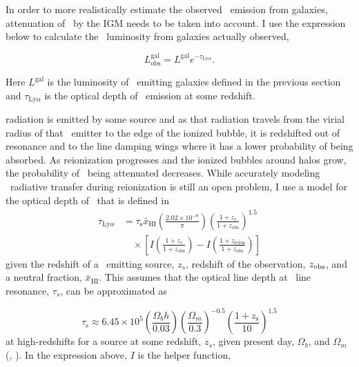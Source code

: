 In order to more realistically estimate the observed \lya\ emission from galaxies,
attenuation of \lya\ by the IGM needs to be taken into account. I use the expression
below to calculate the \lya\ luminosity from galaxies actually observed,

\begin{equation}
L^{\textrm{gal}}_{\textrm{obs}} = L^{\textrm{gal}} e^{-\tau_{\textrm{Ly}\alpha}}.
\end{equation}

Here $L^{\textrm{gal}}$ is the luminosity of \lya\ emitting galaxies defined in the previous section and
$\tau_{\textrm{Ly}\alpha}$ is the optical depth of \lya\ emission at some redshift.

\lya radiation is emitted by some source and as that radiation travels from the virial
radius of that \lya\ emitter to the edge of the ionized bubble, it is redshifted
out of resonance and to the line damping wings where it has a lower probability of
being absorbed. As reionization progresses and the ionized bubbles around halos grow,
the probability of \lya\ being attenuated decreases. While accurately modeling
\lya\ radiative transfer during reionization is still an open problem, I use a
model for the optical depth of \lya\ that is defined in \cite{1998ApJ...501...15M}
\begin{align}
\tau_{\textrm{Ly}\alpha} &= \tau_{\textrm{s}} \bar{x}_{\textrm{HI}} \left( \frac{2.02 \times 10^{-8}}{\pi}\right) \left(\frac{1 + z_s}{1 + z_{\textrm{obs}}} \right)^{1.5} \nonumber \\
& \hspace{1em} \times \left[ I\left(\frac{1 + z_s}{1 + z_{\textrm{obs}}} \right) - I\left(\frac{1 + z_{\textrm{reion}}}{1 + z_{\textrm{obs}}}\right) \right]
\end{align}
given the redshift of a \lya\ emitting source, $z_{s}$, redshift of the observation,
$z_{\rm obs}$, and a neutral fraction, $\bar{x}_{\textrm{HI}}$. This assumes that
the optical line depth at \lya\ line resonance, $\tau_s$, can be approximated as

\begin{equation}
\tau_{\textrm{s}} \approx  6.45 \times 10^5 \left( \frac{\Omega_b h}{0.03}\right) \left( \frac{\Omega_m}{0.3}\right)^{-0.5} \left(  \frac{1 + z_{\textrm{s}}}{10}\right)^{1.5}
\end{equation}
at high-redshifts for a source at some redshift, $z_{s}$, given present day, $\Omega_b$, and $\Omega_m$ (\cite{1965ApJ...142.1633G}, \cite{2001PhR...349..125B}). In the expression
above, $I$ is the helper function,

